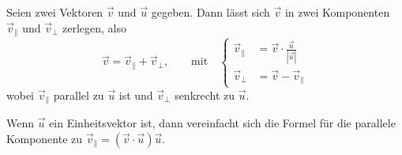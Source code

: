 \begin{satz}
Seien zwei Vektoren $\vec{v}$ und $\vec{u}$ gegeben.
Dann lässt sich $\vec{v}$ in zwei Komponenten $\vec{v}_{\|}$ und
$\vec{v}_{\perp}$ zerlegen, also
\[
\vec{v} = \vec{v}_{\|} + \vec{v}_{\perp},
\qquad
\text{mit}
\quad
\left\{
\begin{aligned}
\vec{v}_{\|}   &= \vec{v}\cdot\frac{\vec{u}}{|\vec{u}|}
\\
\vec{v}_{\perp}&= \vec{v}-\vec{v}_{\|}
\end{aligned}
\right.
\]
wobei $\vec{v}_{\|}$ parallel zu $\vec{u}$ ist und $\vec{v}_{\perp}$
senkrecht zu $\vec{u}$.

Wenn $\vec{u}$ ein Einheitsvektor ist, dann vereinfacht sich die Formel
für die parallele Komponente zu
$\vec{v}_{\|} =(\vec{v}\cdot\vec{u})\vec{u}$.
\end{satz}

%
%
